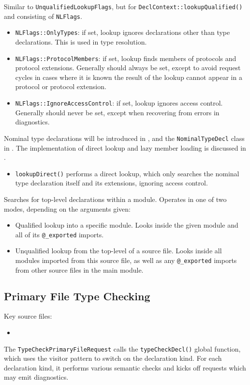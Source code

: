 \documentclass[../generics]{subfiles}
\begin{document}
Similar to \texttt{UnqualifiedLookupFlags}, but for \texttt{DeclContext::lookupQualified()} and consisting of \texttt{NLFlags}.
\begin{itemize}
\item \verb|NLFlags::OnlyTypes|: if set, lookup ignores declarations other than type declarations. This is used in type resolution.
\item \verb|NLFlags::ProtocolMembers|: if set, lookup finds members of protocols and protocol extensions. Generally should always be set, except to avoid request cycles in cases where it is known the result of the lookup cannot appear in a protocol or protocol extension.
\item \verb|NLFlags::IgnoreAccessControl|: if set, lookup ignores access control. Generally should never be set, except when recovering from errors in diagnostics.
\end{itemize}

Nominal type declarations will be introduced in , and the \texttt{NominalTypeDecl} class in . The implementation of direct lookup and lazy member loading is discussed in .
\begin{itemize}
\item \texttt{lookupDirect()} performs a direct lookup, which only searches the nominal type declaration itself and its extensions, ignoring access control.
\end{itemize}

Searches for top-level declarations within a module. Operates in one of two modes, depending on the arguments given:
\begin{itemize}
\item Qualified lookup into a specific module. Looks inside the given module and all of its \verb|@_exported| imports.
\item Unqualified lookup from the top-level of a source file. Looks inside all modules imported from this source file, as well as any \verb|@_exported| imports from other source files in the main module.
\end{itemize}

\subsection*{Primary File Type Checking}
Key source files:
\begin{itemize}
\item {}
\end{itemize}
The \texttt{TypeCheckPrimaryFileRequest} calls the \texttt{typeCheckDecl()} global function, which uses the visitor pattern to switch on the declaration kind. For each declaration kind, it performs various semantic checks and kicks off requests which may emit diagnostics.
\end{document}
